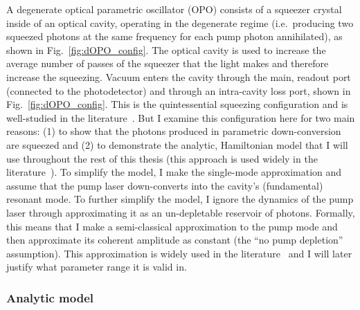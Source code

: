 A degenerate optical parametric oscillator (OPO) consists of a squeezer crystal inside of an optical cavity, operating in the degenerate regime (i.e.\ producing two squeezed photons at the same frequency for each pump photon annihilated), as shown in Fig.~\ref{fig:dOPO_config}. The optical cavity is used to increase the average number of passes of the squeezer that the light makes and therefore increase the squeezing. Vacuum enters the cavity through the main, readout port (connected to the photodetector) and through an intra-cavity loss port, shown in Fig.~\ref{fig:dOPO_config}. This is the quintessential squeezing configuration and is well-studied in the literature~\cite{}. But I examine this configuration here for two main reasons: (1) to show that the photons produced in parametric down-conversion are squeezed and (2) to demonstrate the analytic, Hamiltonian model that I will use throughout the rest of this thesis (this approach is used widely in the literature~\cite{}).  
To simplify the model, I make the single-mode approximation and assume that the pump laser down-converts into the cavity's (fundamental) resonant mode.
To further simplify the model, I ignore the dynamics of the pump laser through approximating it as an un-depletable reservoir of photons. Formally, this means that I make a semi-classical approximation to the pump mode and then approximate its coherent amplitude as constant (the ``no pump depletion'' assumption). This approximation is widely used in the literature~\cite{} and I will later justify what parameter range it is valid in.

\subsubsection{Analytic model}
\label{sec:dOPO_model}

